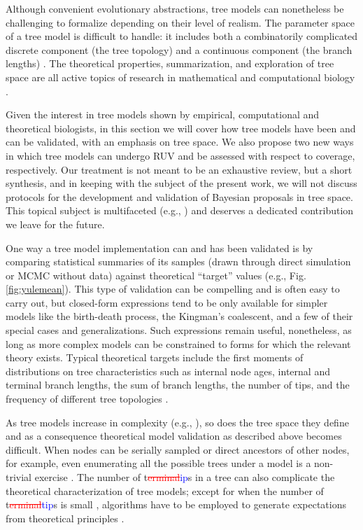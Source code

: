 \documentclass[oneside]{article}
\begin{document}
Although convenient evolutionary abstractions, tree models can nonetheless be challenging to formalize depending on their level of realism.
The parameter space of a tree model is difficult to handle: it includes both a combinatorily complicated discrete component (the tree topology) and a continuous component (the branch lengths) \citep{semple03}.
The theoretical properties, summarization, and exploration of tree space are all active topics of research in mathematical and computational biology \citep{gavryushkina13,gavryushkin16,brown20}.

Given the interest in tree models shown by empirical, computational and theoretical biologists, in this section we will cover how tree models have been and can be validated, with an emphasis on tree space.
We also propose two new ways in which tree models can undergo RUV and be assessed with respect to coverage, respectively.
Our treatment is not meant to be an exhaustive review, but a short synthesis, and in keeping with the subject of the present work, we will not discuss protocols for the development and validation of Bayesian proposals in tree space.
This topical subject is multifaceted (e.g., \citealp{douglas21,bouckaert22,douglas22}) and deserves a dedicated contribution we leave for the future.

One way a tree model implementation can and has been validated is by comparing statistical summaries of its samples (drawn through direct simulation or MCMC without data) against theoretical ``target'' values (e.g., Fig. \ref{fig:yulemean}).
This type of validation can be compelling and is often easy to carry out, but closed-form expressions tend to be only available for simpler models like the birth-death process, the Kingman's coalescent, and a few of their special cases and generalizations.
Such expressions remain useful, nonetheless, as long as more complex models can be constrained to forms for which the relevant theory exists.
Typical theoretical targets include the first moments of distributions on tree characteristics such as internal node ages, internal and terminal branch lengths, the sum of branch lengths, the number of tips, and the frequency of different tree topologies \citep{tj83,rosenberg02,aldous05,nee06,gernhard06,gernhard08,wakeley09,mooers12}.

As tree models increase in complexity (e.g., \citealp{maddison07,goldberg12,fitzjohn10,scire22}), so does the tree space they define and as a consequence theoretical model validation as described above becomes difficult.
When nodes can be serially sampled or direct ancestors of other nodes, for example, even enumerating all the possible trees under a model is a non-trivial exercise \citep{gavryushkina13}. 
The number of t\textcolor{red}{\st{erminal}}\textcolor{blue}{ip}s in a tree can also complicate the theoretical characterization of tree models; except for when the number of t\textcolor{red}{\st{erminal}}\textcolor{blue}{tip}s is small \citep{beast2book}, algorithms have to be employed to generate expectations from theoretical principles \citep{kim19}.
\end{document}
